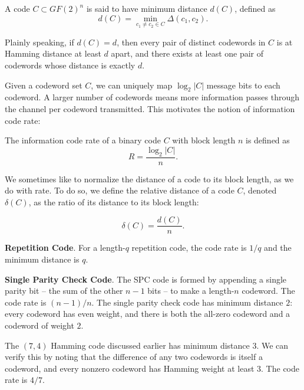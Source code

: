 \begin{definition}
    A code \(C \subset GF(2)^n\)  is said to have minimum distance \(d(C)\), defined as
\[ d(C) = \min_{c_1 \neq c_2 \in C} \Delta(c_1, c_2).\]
\end{definition}

Plainly speaking, if \(d(C) = d\), then every pair of distinct codewords in \(C\) is at Hamming distance at least \(d\) apart, and there exists at least one pair of codewords whose distance is exactly \(d\).

Given a codeword set \(C\), we can uniquely map \(\log_{2}|C|\) message bits to each codeword. A larger number of codewords means more information passes through the channel per codeword transmitted. This motivates the notion of information code rate:     
\begin{definition}
The information code rate of a binary code \(C\) with block length \(n\) is defined as 
\[R = \frac{\log_{2}|C|}{n}.\]    
\end{definition}


We sometimes like to normalize the distance of a code to its block length, as we do with rate. To do so, we define the relative distance of a code \(C\), denoted \(\delta(C)\), as the ratio of its distance to its block length:

\[\delta(C) = \frac{d(C)}{n}. \]

\begin{example}
\textbf{Repetition Code}. For a length-\(q\) repetition code, the code rate is \(1/q\) and the minimum distance is \(q\). 
\end{example}

\begin{example}
\textbf{Single Parity Check Code}. The SPC code is formed by appending a single parity bit -- the sum of the other \(n-1\) bits -- to make a length-\(n\) codeword. The code rate is \((n-1)/n\). The single parity check code has minimum distance \(2\): every codeword has even weight, and there is both the all-zero codeword and a codeword of weight \(2\).
\end{example}

\begin{example}
The \((7,4)\) Hamming code discussed earlier has minimum distance \(3\). We can verify this by noting that the difference of any two codewords is itself a codeword, and every nonzero codeword has Hamming weight at least \(3\). The code rate is \(4/7\).
\end{example}



